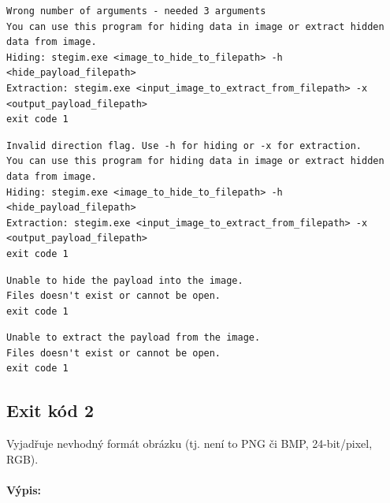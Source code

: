 \documentclass[12pt]{report}
\begin{document}
    \begin{mdframed}
        \begin{verbatim}
Wrong number of arguments - needed 3 arguments
You can use this program for hiding data in image or extract hidden data from image.
Hiding: stegim.exe <image_to_hide_to_filepath> -h <hide_payload_filepath>
Extraction: stegim.exe <input_image_to_extract_from_filepath> -x <output_payload_filepath>
exit code 1
        \end{verbatim}
    \end{mdframed}

    \begin{mdframed}
        \begin{verbatim}
Invalid direction flag. Use -h for hiding or -x for extraction.
You can use this program for hiding data in image or extract hidden data from image.
Hiding: stegim.exe <image_to_hide_to_filepath> -h <hide_payload_filepath>
Extraction: stegim.exe <input_image_to_extract_from_filepath> -x <output_payload_filepath>
exit code 1
        \end{verbatim}
    \end{mdframed}

    \begin{mdframed}
        \begin{verbatim}
Unable to hide the payload into the image.
Files doesn't exist or cannot be open.
exit code 1
        \end{verbatim}
    \end{mdframed}

    \begin{mdframed}
        \begin{verbatim}
Unable to extract the payload from the image.
Files doesn't exist or cannot be open.
exit code 1
        \end{verbatim}
    \end{mdframed}

    \subsection{Exit kód 2}
    Vyjadřuje nevhodný formát obrázku (tj. není to PNG či BMP, 24-bit/pixel,
    RGB).\\

    \paragraph{Výpis:}\\
\end{document}
